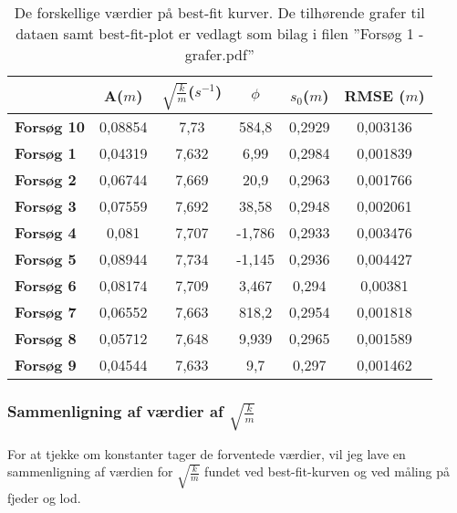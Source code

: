 \begin{table}[h]
\centering
\begin{tabular}{|l|c|c|c|c|c|}
\hline
\textbf{}          & \textbf{A}($m$) & \textbf{$\sqrt{\frac{k}{m}}$}($s^{-1}$) & \textbf{$\phi$} & \textbf{$s_0$}($m$) & \textbf{RMSE }($m$) \\ \hline
\textbf{Forsøg 10} & 0,08854    & 7,73                          & 584,8           & 0,2929         & 0,003136      \\ \hline
\textbf{Forsøg 1}  & 0,04319    & 7,632                         & 6,99            & 0,2984         & 0,001839      \\ \hline
\textbf{Forsøg 2}  & 0,06744    & 7,669                         & 20,9            & 0,2963         & 0,001766      \\ \hline
\textbf{Forsøg 3}  & 0,07559    & 7,692                         & 38,58           & 0,2948         & 0,002061      \\ \hline
\textbf{Forsøg 4}  & 0,081      & 7,707                         & -1,786          & 0,2933         & 0,003476      \\ \hline
\textbf{Forsøg 5}  & 0,08944    & 7,734                         & -1,145          & 0,2936         & 0,004427      \\ \hline
\textbf{Forsøg 6}  & 0,08174    & 7,709                         & 3,467           & 0,294          & 0,00381       \\ \hline
\textbf{Forsøg 7}  & 0,06552    & 7,663                         & 818,2           & 0,2954         & 0,001818      \\ \hline
\textbf{Forsøg 8}  & 0,05712    & 7,648                         & 9,939           & 0,2965         & 0,001589      \\ \hline
\textbf{Forsøg 9}  & 0,04544    & 7,633                         & 9,7             & 0,297          & 0,001462      \\ \hline
\end{tabular}

\caption{De forskellige værdier på best-fit kurver. De tilhørende grafer til dataen samt best-fit-plot er vedlagt som bilag i filen ''Forsøg 1 - grafer.pdf''}
\label{tabel: bestfitkurver forsog 1}
\end{table}

\subsubsection{Sammenligning af værdier af $\sqrt{\frac{k}{m}}$}\label{exp1: teoretisk bestemmelse af sqrt k over m}
For at tjekke om konstanter tager de forventede værdier, vil jeg lave en sammenligning af værdien for $\sqrt{\frac{k}{m}}$ fundet ved best-fit-kurven og ved måling på fjeder og lod.

